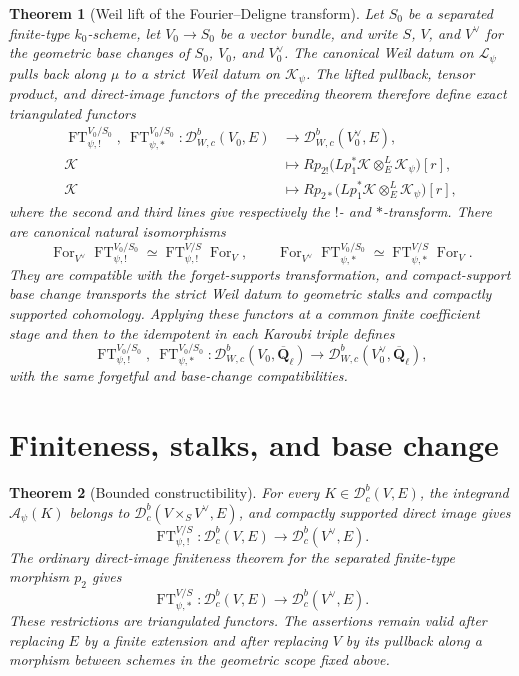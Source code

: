 \documentclass[10pt]{article}
\newtheorem{theorem}{Theorem}[section]
\theoremstyle{definition}
\newcommand{\Qlb}{\overline{\mathbf Q}_\ell}
\newcommand{\Dbc}{\mathcal D^b_c}
\newcommand{\FT}{\operatorname{FT}}
\begin{document}
\begin{theorem}[Weil lift of the Fourier--Deligne transform]
Let \(S_0\) be a separated finite-type \(k_0\)-scheme, let
\(V_0\to S_0\) be a vector bundle, and write \(S\), \(V\), and \(V^\vee\)
for the geometric base changes of \(S_0\), \(V_0\), and \(V_0^\vee\).
The canonical Weil datum on
\(\mathcal L_\psi\) pulls back along \(\mu\) to a strict Weil datum on
\(\mathcal K_\psi\).  The lifted pullback, tensor product, and direct-image
functors of the preceding theorem therefore define exact triangulated
functors
\[
 \begin{aligned}
 \FT^{V_0/S_0}_{\psi,!},\ \FT^{V_0/S_0}_{\psi,*}:
 \mathcal D^b_{W,c}(V_0,E)&\longrightarrow
 \mathcal D^b_{W,c}(V_0^\vee,E),\\
 \mathcal K&\longmapsto
 Rp_{2!}\bigl(Lp_1^*\mathcal K\otimes_E^L\mathcal K_\psi\bigr)[r],\\
 \mathcal K&\longmapsto
 Rp_{2*}\bigl(Lp_1^*\mathcal K\otimes_E^L\mathcal K_\psi\bigr)[r],
 \end{aligned}
\]
where the second and third lines give respectively the \(!\)- and
\(*\)-transform.  There are canonical natural isomorphisms
\[
 \operatorname{For}_{V^\vee}
   \FT^{V_0/S_0}_{\psi,!}
 \simeq
 \FT^{V/S}_{\psi,!}\operatorname{For}_V,
 \qquad
 \operatorname{For}_{V^\vee}
   \FT^{V_0/S_0}_{\psi,*}
 \simeq
 \FT^{V/S}_{\psi,*}\operatorname{For}_V.
\]
They are compatible with the forget-supports transformation, and
compact-support base change transports the strict Weil datum to geometric
stalks and compactly supported cohomology.  Applying these functors at a
common finite coefficient stage and then to the idempotent in each Karoubi
triple defines
\[
 \FT^{V_0/S_0}_{\psi,!},\ \FT^{V_0/S_0}_{\psi,*}:
 \mathcal D^b_{W,c}(V_0,\Qlb)\longrightarrow
 \mathcal D^b_{W,c}(V_0^\vee,\Qlb),
\]
with the same forgetful and base-change compatibilities.
\end{theorem}

\section{Finiteness, stalks, and base change}

\begin{theorem}[Bounded constructibility]
For every \(K\in\Dbc(V,E)\), the integrand
\(\mathcal A_\psi(K)\) belongs to
\(\Dbc(V\times_SV^\vee,E)\), and compactly supported direct image gives
\[
 \FT^{V/S}_{\psi,!}:\Dbc(V,E)\longrightarrow\Dbc(V^\vee,E).
\]
The ordinary direct-image finiteness theorem for the separated finite-type
morphism \(p_2\) gives
\[
 \FT^{V/S}_{\psi,*}:\Dbc(V,E)\longrightarrow\Dbc(V^\vee,E).
\]
These restrictions are triangulated functors.  The assertions remain valid
after replacing \(E\) by a finite extension and after replacing \(V\) by its
pullback along a morphism between schemes in the geometric scope fixed
above.
\end{theorem}
\end{document}
